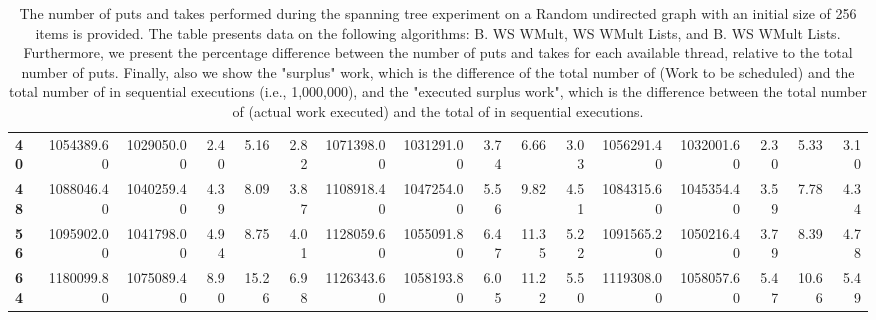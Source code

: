 \begin{table}[!ht]
{\begin{tabular}{lrrrrrrrrrrrrrrr}
\textbf{40} &  1054389.60 & 1029050.00 &           2.40 &        5.16 &                 2.82 &     1071398.00 & 1031291.00 &           3.74 &        6.66 &                 3.03 &        1056291.40 & 1032001.60 &           2.30 &        5.33 &                 3.10 \\
\textbf{48} &  1088046.40 & 1040259.40 &           4.39 &        8.09 &                 3.87 &     1108918.40 & 1047254.00 &           5.56 &        9.82 &                 4.51 &        1084315.60 & 1045354.40 &           3.59 &        7.78 &                 4.34 \\
\textbf{56} &  1095902.00 & 1041798.00 &           4.94 &        8.75 &                 4.01 &     1128059.60 & 1055091.80 &           6.47 &       11.35 &                 5.22 &        1091565.20 & 1050216.40 &           3.79 &        8.39 &                 4.78 \\
\textbf{64} &  1180099.80 & 1075089.40 &           8.90 &       15.26 &                 6.98 &     1126343.60 & 1058193.80 &           6.05 &       11.22 &                 5.50 &        1119308.00 & 1058057.60 &           5.47 &       10.66 &                 5.49 \\
\bottomrule
\end{tabular}}
\label{difference-Random_directed-256-B_WS_NC_MULT_OPT-WS_NC_MULT_LA_OPT-B_WS_NC_MULT_LA_OPT}
\caption{The number of puts and takes performed during the
    spanning tree experiment on a Random undirected graph with an initial size
    of 256 items is provided. The table presents data on the
    following algorithms: B. WS WMult, WS WMult Lists, and
    B. WS WMult Lists. Furthermore, we present the percentage difference
    between the number of puts and takes for each available thread,
    relative to the total number of puts. Finally, also we show the
    "surplus" work, which is the difference of the total number of
    \Puts (Work to be scheduled) and the total number of \Puts in
    sequential executions (i.e., 1,000,000), and the "executed surplus
    work", which is the difference between the total number of \Takes
    (actual work executed) and the total of \Takes in sequential
    executions.}
\end{table}

